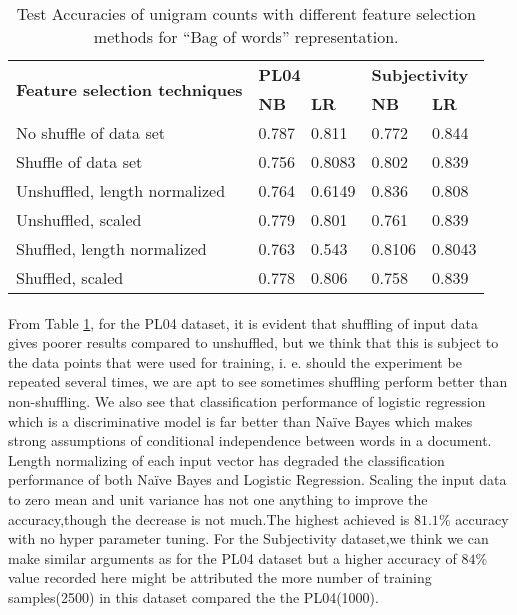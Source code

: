 \documentclass[a4paper,26pt]{article}
\begin{document}
\begin{table}[H]
\centering
\begin{tabular}{|l|l|l|l|l|}
\hline
\multirow{2}{*}{\textbf{Feature selection techniques}} & \multicolumn{2}{l|}{\textbf{PL04}} & \multicolumn{2}{l|}{\textbf{Subjectivity}} \\ \cline{2-5} 
                                                       & \textbf{NB}      & \textbf{LR}     & \textbf{NB}          & \textbf{LR}         \\ \hline
No shuffle of data set                                 & 0.787            & 0.811           & 0.772                & 0.844               \\ 
Shuffle of data set                                    & 0.756            & 0.8083          & 0.802                & 0.839               \\ 
Unshuffled, length normalized                          & 0.764            & 0.6149          & 0.836                & 0.808               \\ 
Unshuffled, scaled                                     & 0.779            & 0.801           & 0.761                & 0.839               \\ 
Shuffled, length normalized                            & 0.763            & 0.543           & 0.8106               & 0.8043              \\ 
Shuffled, scaled                                       & 0.778            & 0.806           & 0.758                & 0.839               \\ \hline
\end{tabular}
\caption{Test Accuracies of unigram counts with different feature selection methods for ``Bag of words'' representation.}
\label{tab:unigram test accuracies}
\end{table}

\paragraph{}
From Table \ref{tab:unigram test accuracies}, for the PL04 dataset, it is evident that shuffling of input data gives poorer results compared to unshuffled, but we think that this is subject to the data points that were used for training, i. e. should the experiment be repeated several times, we are apt to see sometimes shuffling perform better than non-shuffling. We also see that classification performance of logistic regression which is a discriminative model is far better than Na\"{i}ve Bayes which makes strong assumptions of conditional independence between words in a document. Length normalizing of each input vector has degraded the classification performance of both Na\"{i}ve Bayes and Logistic Regression. Scaling the input data to zero mean and unit variance has not one anything to improve the accuracy,though the decrease is not much.The highest achieved is $81.1\%$ accuracy with no hyper parameter tuning. For the Subjectivity dataset,we think we can make similar arguments as for the PL04 dataset but a higher accuracy of $84\%$ value recorded here might be attributed the more number of training samples(2500) in this dataset compared the the PL04(1000).
\end{document}
